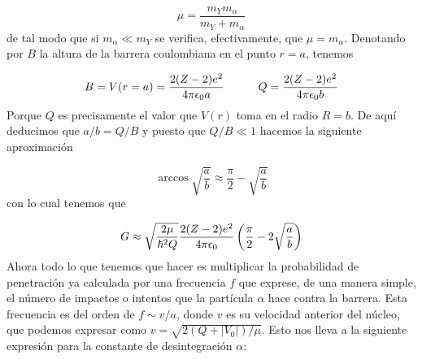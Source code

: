 \begin{equation*}
	\mu = \frac{m_Y m_\alpha}{m_Y + m_\alpha} 
\end{equation*}
de tal modo que si $m_\alpha \ll m_Y$ se verifica, efectivamente, que $\mu=m_\alpha$. Denotando por $B$ la altura de la barrera coulombiana en el punto $r=a$, tenemos 

\begin{equation}
    B= V(r=a) = \frac{2(Z-2)e^2}{4\pi \epsilon_0 a} \quad \quad \quad Q=\frac{2(Z-2)e^2}{4 \pi \epsilon_0 b}
\end{equation}
Porque $Q$ es precisamente el valor que $V(r)$ toma en el radio $R=b$. De aquí deducimos que $a/b=Q/B$ y puesto que $Q/B\ll 1$ hacemos la siguiente aproximación 

\begin{equation}
    \arccos \sqrt{\frac{a}{b}} \approx \frac{\pi}{2} - \sqrt{\frac{a}{b}}
\end{equation}
con lo cual tenemos que 

\begin{equation}
    G \approx  \sqrt{\frac{2\mu}{\hbar^2Q}} \frac{2(Z-2)e^2}{4 \pi \epsilon_0} \left( \frac{\pi}{2} -2 \sqrt{\frac{a}{b}} \right)
\end{equation}
Ahora todo lo que tenemos que hacer es multiplicar la probabilidad de penetración ya calculada por una frecuencia $f$ que exprese, de una manera simple, el número de impactos o intentos que la partícula $\alpha$ hace contra la barrera. Esta frecuencia es del orden de $f \sim v/a$, donde $v$ es su velocidad anterior del núcleo, que podemos expresar como $v=\sqrt{2(Q+|V_0|)/\mu}$. Esto nos lleva a la siguiente expresión para la constante de desintegración $\alpha$:

